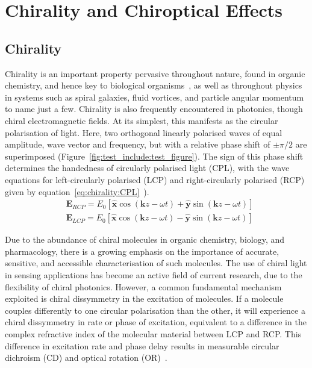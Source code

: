 \section{Chirality and Chiroptical Effects}
\label{sec:background:ChiropticalEffects}

\subsection{Chirality}
\label{sec:chirality}

Chirality is an important property pervasive throughout nature, found in organic chemistry, and hence key to biological organisms~\cite{Berova2012}, as well as throughout physics in systems such as spiral galaxies, fluid vortices, and particle angular momentum to name just a few. Chirality is also frequently encountered in photonics, though chiral electromagnetic fields. At its simplest, this manifests as the circular polarisation of light. Here, two orthogonal linearly polarised waves of equal amplitude, wave vector and frequency, but with a relative phase shift of $\pm \pi/2$ are superimposed (Figure~\ref{fig:test_include:test_figure}). The sign of this phase shift determines the handedness of circularly polarised light (CPL), with the wave equations for left-circularly polarised (LCP) and right-circularly polarised (RCP) given by equation~\ref{eq:chirality:CPL}~\cite[\S 8.1.2]{Hecht2013}).
\begin{equation}
    \label{eq:chirality:CPL}
    \begin{split}
        & \mathbf{E}_{RCP} = E_0 \left[ \mathbf{\hat{x}} \cos(\mathbf{k} z-\omega t) + \mathbf{\hat{y}} \sin(\mathbf{k} z-\omega t )\right]\\
        & \mathbf{E}_{LCP}= E_0 \left[ \mathbf{\hat{x}} \cos(\mathbf{k} z-\omega t) - \mathbf{\hat{y}} \sin(\mathbf{k} z-\omega t )\right]
    \end{split}
\end{equation}

Due to the abundance of chiral molecules in organic chemistry, biology, and pharmacology, there is a growing emphasis on the importance of accurate, sensitive, and accessible characterisation of such molecules. The use of chiral light in sensing applications has become an active field of current research, due to the flexibility of chiral photonics. However, a common fundamental mechanism exploited is chiral dissymmetry in the excitation of molecules. If a molecule couples differently to one circular polarisation than the other, it will experience a chiral dissymmetry in rate or phase of excitation, equivalent to a difference in the complex refractive index of the molecular material between LCP and RCP. This difference in excitation rate and phase delay results in measurable circular dichroism (CD) and optical rotation (OR)~\cite[\S 1]{purdie1993}.

